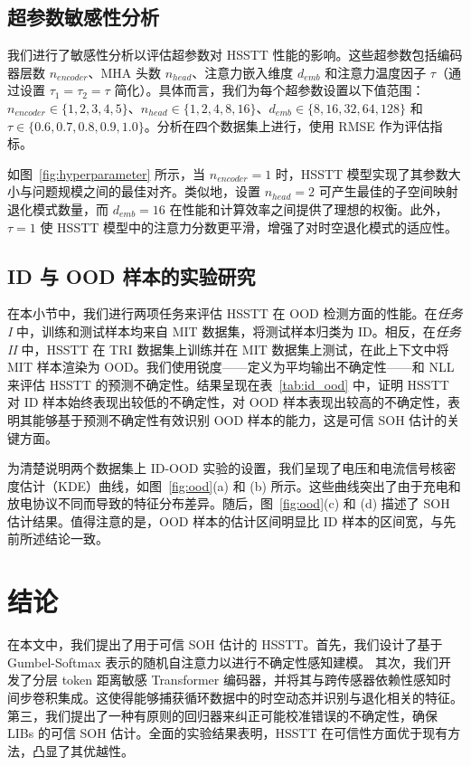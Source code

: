 \documentclass[UTF8,journal,twoside,web]{ieeecolor}
\begin{document}
\subsection{超参数敏感性分析}\label{subsec:sensitivity_analysis}

我们进行了敏感性分析以评估超参数对 HSSTT 性能的影响。这些超参数包括编码器层数 $n_{encoder}$、MHA 头数 $n_{head}$、注意力嵌入维度 $d_{emb}$ 和注意力温度因子 $\tau$（通过设置 $\tau_{1} = \tau_{2} = \tau$ 简化）。具体而言，我们为每个超参数设置以下值范围：$n_{encoder} \in \{1, 2, 3, 4, 5\}$、$n_{head} \in \{1, 2, 4, 8, 16\}$、$d_{emb} \in \{8, 16, 32, 64, 128\}$ 和 $\tau \in \{0.6, 0.7, 0.8, 0.9, 1.0\}$。分析在四个数据集上进行，使用 RMSE 作为评估指标。

如图~\ref{fig:hyperparameter} 所示，当 $n_{encoder} = 1$ 时，HSSTT 模型实现了其参数大小与问题规模之间的最佳对齐。类似地，设置 $n_{head} = 2$ 可产生最佳的子空间映射退化模式数量，而 $d_{emb} = 16$ 在性能和计算效率之间提供了理想的权衡。此外，$\tau = 1$ 使 HSSTT 模型中的注意力分数更平滑，增强了对时空退化模式的适应性。

\subsection{ID 与 OOD 样本的实验研究}\label{subsec:id_ood}

在本小节中，我们进行两项任务来评估 HSSTT 在 OOD 检测方面的性能。在\textit{任务 I} 中，训练和测试样本均来自 MIT 数据集，将测试样本归类为 ID。相反，在\textit{任务 II} 中，HSSTT 在 TRI 数据集上训练并在 MIT 数据集上测试，在此上下文中将 MIT 样本渲染为 OOD。我们使用锐度——定义为平均输出不确定性——和 NLL 来评估 HSSTT 的预测不确定性。结果呈现在表~\ref{tab:id_ood} 中，证明 HSSTT 对 ID 样本始终表现出较低的不确定性，对 OOD 样本表现出较高的不确定性，表明其能够基于预测不确定性有效识别 OOD 样本的能力，这是可信 SOH 估计的关键方面。

为清楚说明两个数据集上 ID-OOD 实验的设置，我们呈现了电压和电流信号核密度估计（KDE）曲线，如图~\ref{fig:ood}(a) 和 (b) 所示。这些曲线突出了由于充电和放电协议不同而导致的特征分布差异。随后，图~\ref{fig:ood}(c) 和 (d) 描述了 SOH 估计结果。值得注意的是，OOD 样本的估计区间明显比 ID 样本的区间宽，与先前所述结论一致。

\section{结论}\label{sec:conclusion}

在本文中，我们提出了用于可信 SOH 估计的 HSSTT。首先，我们设计了基于 Gumbel-Softmax 表示的随机自注意力以进行不确定性感知建模。
% 
其次，我们开发了分层 token 距离敏感 Transformer 编码器，并将其与跨传感器依赖性感知时间步卷积集成。这使得能够捕获循环数据中的时空动态并识别与退化相关的特征。
% 
第三，我们提出了一种有原则的回归器来纠正可能校准错误的不确定性，确保 LIBs 的可信 SOH 估计。全面的实验结果表明，HSSTT 在可信性方面优于现有方法，凸显了其优越性。
\end{document}
